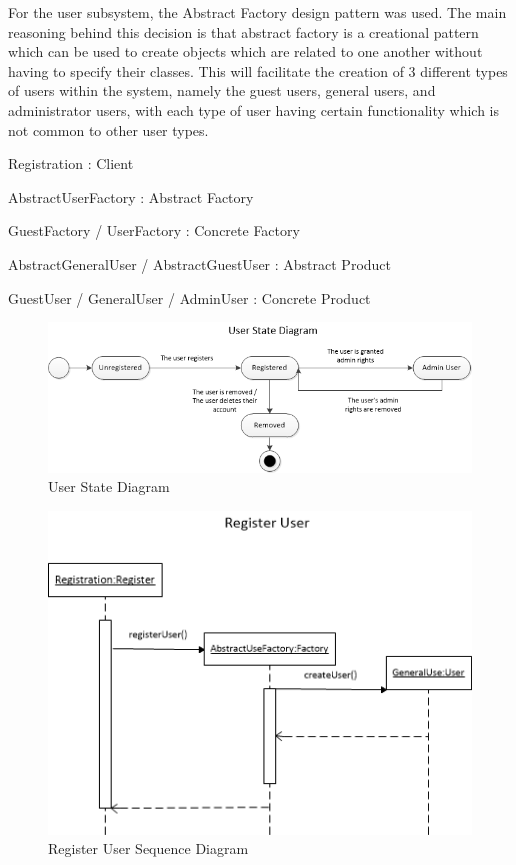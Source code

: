\documentclass{article}
\begin{document}
    \begin{flushleft}
    
    For the user subsystem, the Abstract Factory design pattern was used. The main reasoning behind this decision is that abstract factory is a creational pattern which can be used to create objects which are related to one another without having to specify their classes. This will facilitate the creation of 3 different types of users within the system, namely the guest users, general users, and administrator users, with each type of user having certain functionality which is not common to other user types.
    
     \bigskip
     
    Registration : Client

AbstractUserFactory : Abstract Factory

GuestFactory / UserFactory : Concrete Factory

AbstractGeneralUser / AbstractGuestUser : Abstract Product

GuestUser / GeneralUser / AdminUser : Concrete Product

\end{flushleft}

	\begin{figure}[h!]
      \includegraphics[width=\textwidth]{User/img/User_State_Diagram.png}
      \caption{User State Diagram}
    \end{figure}

	\begin{figure}[h!]
      \includegraphics[width=\textwidth]{User/img/Register_User_Sequence_Diagram.png}
      \caption{Register User Sequence Diagram}
    \end{figure}
    
\end{document}
